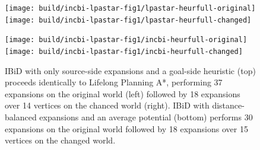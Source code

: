 \begin{figure}
   \centering%
   
   \texttt{[image: build/incbi-lpastar-fig1/lpastar-heurfull-original]}%
   \;\;%
   \texttt{[image: build/incbi-lpastar-fig1/lpastar-heurfull-changed]}%
   
   \vspace{0.2cm}
   
   \texttt{[image: build/incbi-lpastar-fig1/incbi-heurfull-original]}%
   \;\;%
   \texttt{[image: build/incbi-lpastar-fig1/incbi-heurfull-changed]}%
   
   \caption{IBiD with only source-side expansions and a goal-side
      heuristic (top) proceeds identically to Lifelong Planning A*,
      performing 37 expansions on the original world (left)
      followed by 18 expansions over 14 vertices on the chanced
      world (right).
      IBiD with distance-balanced expansions and an average
      potential (bottom)
      performs 30 expansions on the original world
      followed by 18 expansions over 15 vertices on the changed
      world.}
   \label{fig:incbi-lpastar-fig1}
\end{figure}

